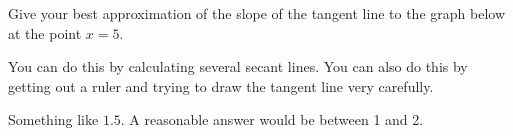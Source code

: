 \begin{question}
Give your best approximation of the slope of the tangent line to
the graph below at the point $x=5$.
\begin{center}
\end{center}
\end{question}
\begin{hint} You can do this by calculating several secant lines. You can also do this by getting out a ruler and trying to draw the tangent line very carefully.
\end{hint}
\begin{answer} Something like $1.5$. A reasonable answer would be between 1 and 2.
\end{answer}
